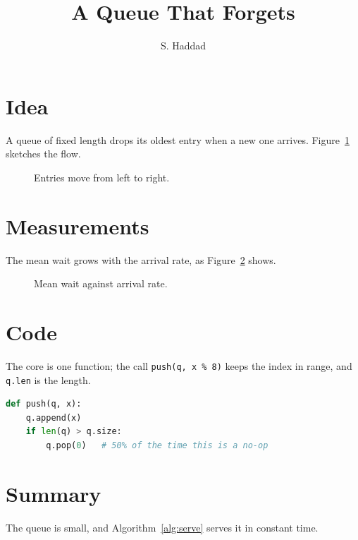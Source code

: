 \documentclass{article}
\title{A Queue That Forgets}
\author{S. Haddad}
\date{}
\begin{document}
\maketitle

\section{Idea}
A queue of fixed length drops its oldest entry when a new one arrives.
Figure~\ref{fig:flow} sketches the flow.

\begin{figure}[ht]
\centering
{}
\caption{Entries move from left to right.}\label{fig:flow}
\end{figure}

\section{Measurements}
The mean wait grows with the arrival rate, as Figure~\ref{fig:wait} shows.

\begin{figure}[ht]
\centering
{}
\caption{Mean wait against arrival rate.}\label{fig:wait}
\end{figure}

\section{Code}
The core is one function; the call \lstinline|push(q, x % 8)| keeps the index in range,
and \lstinline!q.len! is the length.

\begin{lstlisting}[language=Python]
def push(q, x):
    q.append(x)
    if len(q) > q.size:
        q.pop(0)   # 50% of the time this is a no-op
\end{lstlisting}

\begin{algorithm}[ht]
\caption{Serve one entry}\label{alg:serve}
\end{algorithm}

\section{Summary}
The queue is small, and Algorithm~\ref{alg:serve} serves it in constant time.
\end{document}
